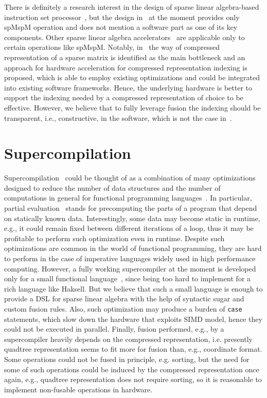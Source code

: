 \documentclass[10pt,conference]{IEEEtran}
\begin{document}
There is definitely a research interest in the design of sparse linear algebra-based instruction set processor~\cite{Song_2016}, but the design in~\cite{Song_2016} at the moment provides only spMspM operation and does not mention a software part as one of its key components.
Other sparse linear algebra accelerators~\cite{CPU-FPGA,OuterSpace,zhang2020sparch} are applicable only to certain operations like spMspM.
Notably, in~\cite{smash} the way of compressed representation of a sparse matrix is identified as the main bottleneck and an approach for hardware acceleration for compressed representation indexing is proposed, which is able to employ existing optimizations and could be integrated into existing software frameworks.
Hence, the underlying hardware is better to support the indexing needed by a compressed representation of choice to be effective.
However, we believe that to fully leverage fusion the indexing should be transparent, i.e., constructive, in the software, which is not the case in~\cite{smash}.

\section{Supercompilation}
Supercompilation~\cite{supercompilation} could be thought of as a combination of many optimizations designed to reduce the number of data structures and the number of computations in general for functional programming languages~\cite{distillation,WADLER1990231,jones}.
In particular, partial evaluation~\cite{jones} stands for precomputing the parts of a program that depend on statically known data. Interestingly, some data may become static in runtime, e.g., it could remain fixed between different iterations of a loop, thus it may be profitable to perform such optimization even in runtime.
Despite such optimizations are common in the world of functional programming, they are hard to perform in the case of imperative languages widely used in high performance computing.
However, a fully working supercompiler at the moment is developed only for a small functional language~\cite{hosc}, since being too hard to implement for a rich language like Haksell. But we believe that such a small language is enough to provide a DSL for sparse linear algebra with the help of syntactic sugar and custom fusion rules.
Also, such optimization may produce a burden of \texttt{case} statements, which slow down the hardware that exploits SIMD model, hence they could not be executed in parallel.
Finally, fusion performed, e.g., by a supercompiler heavily depends on the compressed representation, i.e. presently quadtree representation seems to fit more for fusion than, e.g., coordinate format. 
Some operations could not be fused in principle, e.g. sorting, but the need for some of such operations could be induced by the compressed representation once again, e.g., quadtree representation does not require sorting, so it is reasonable to implement non-fusable operations in hardware.
\end{document}
